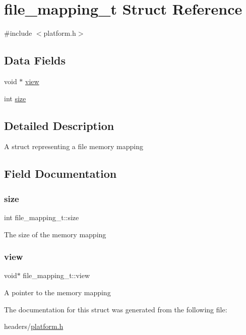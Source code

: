 \hypertarget{structfile__mapping__t}{}\section{file\+\_\+mapping\+\_\+t Struct Reference}
\label{structfile__mapping__t}


{\ttfamily \#include $<$platform.\+h$>$}

\subsection*{Data Fields}
\begin{DoxyCompactItemize}
\item 
void $\ast$ \hyperlink{structfile__mapping__t_a97515f2c3caa3e138996fd539129ba52}{view}
\item 
int \hyperlink{structfile__mapping__t_a8dafaf6c62bbd9834bf92db943c7fc08}{size}
\end{DoxyCompactItemize}


\subsection{Detailed Description}
A struct representing a file memory mapping 

\subsection{Field Documentation}
\mbox{\label{structfile__mapping__t_a8dafaf6c62bbd9834bf92db943c7fc08}} 
\subsubsection{\texorpdfstring{size}{size}}
{\footnotesize\ttfamily int file\+\_\+mapping\+\_\+t\+::size}

The size of the memory mapping \mbox{\label{structfile__mapping__t_a97515f2c3caa3e138996fd539129ba52}} 
\subsubsection{\texorpdfstring{view}{view}}
{\footnotesize\ttfamily void$\ast$ file\+\_\+mapping\+\_\+t\+::view}

A pointer to the memory mapping 

The documentation for this struct was generated from the following file\+:\begin{DoxyCompactItemize}
\item 
headers/\hyperlink{platform_8h}{platform.\+h}\end{DoxyCompactItemize}
